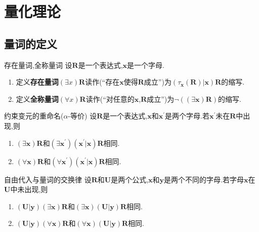 \chapter{量化理论}

\section{量词的定义}

\begin{definition}{存在量词,全称量词}{}
	设$\boldsymbol{R}$是一个表达式,$\boldsymbol{x}$是一个字母.
	\begin{enumerate}
		\item 定义\textbf{存在量词}$\left(\exists x\right)\boldsymbol{R}$读作(``存在$\boldsymbol{x}$使得$\boldsymbol{R}$成立'')为$\left(\tau_{\boldsymbol{x}}\left(\boldsymbol{R}\right)|\boldsymbol{x}\right)\boldsymbol{R}$的缩写.
		\item 定义\textbf{全称量词}$\left(\forall x\right)\boldsymbol{R}$读作(``对任意的$\boldsymbol{x}$,$\boldsymbol{R}$成立'')为$\neg\left(\left(\exists\boldsymbol{x}\right)\boldsymbol{R}\right)$的缩写.
	\end{enumerate}
\end{definition}

\begin{metatheorem}{约束变元的重命名($\alpha$-等价)}{}
	设$\boldsymbol{R}$是一个表达式,$\boldsymbol{x}$和$\boldsymbol{x}^{\prime}$是两个字母.若$\boldsymbol{x}^{\prime}$未在$\boldsymbol{R}$中出现,则
	\begin{enumerate}
		\item $\left(\exists\boldsymbol{x}\right)\boldsymbol{R}$和$\left(\exists\boldsymbol{x}^{\prime}\right)\left(\boldsymbol{x}^{\prime}|\boldsymbol{x}\right)\boldsymbol{R}$相同.
		\item $\left(\forall\boldsymbol{x}\right)\boldsymbol{R}$和$\left(\forall\boldsymbol{x}^{\prime}\right)\left(\boldsymbol{x}^{\prime}|\boldsymbol{x}\right)\boldsymbol{R}$相同.
	\end{enumerate}
\end{metatheorem}

\begin{metatheorem}{自由代入与量词的交换律}{}
	设$\boldsymbol{R}$和$\boldsymbol{U}$是两个公式,$\boldsymbol{x}$和$\boldsymbol{y}$是两个不同的字母.若字母$\boldsymbol{x}$在$\boldsymbol{U}$中未出现,则
	\begin{enumerate}
		\item $\left(\boldsymbol{U}|\boldsymbol{y}\right)\left(\exists\boldsymbol{x}\right)\boldsymbol{R}$和$\left(\exists\boldsymbol{x}\right)\left(\boldsymbol{U}|\boldsymbol{y}\right)\boldsymbol{R}$相同.
		\item $\left(\boldsymbol{U}|\boldsymbol{y}\right)\left(\forall\boldsymbol{x}\right)\boldsymbol{R}$和$\left(\forall\boldsymbol{x}\right)\left(\boldsymbol{U}|\boldsymbol{y}\right)\boldsymbol{R}$相同.
	\end{enumerate}
\end{metatheorem}

